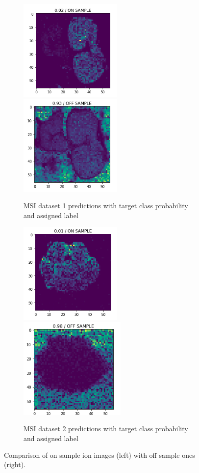 \documentclass[a4paper]{article}
\begin{document}
    \begin{figure}[H]
        \begin{subfigure}[b]{\textwidth}
            \centering
            \includegraphics[width=\textwidth,height=5cm,keepaspectratio]{on_sample_test_pred_1.png}
            \includegraphics[width=\textwidth,height=5cm,keepaspectratio]{off_sample_test_pred_1.png}
            \caption{MSI dataset 1 predictions with target class probability and assigned label}
        \end{subfigure}
        \begin{subfigure}[b]{\textwidth}
            \centering
            \includegraphics[width=\textwidth,height=5cm,keepaspectratio]{on_sample_test_pred_2.png}
            \includegraphics[width=\textwidth,height=5cm,keepaspectratio]{off_sample_test_pred_2.png}
            \caption{MSI dataset 2 predictions with target class probability and assigned label}
        \end{subfigure}
        \caption{Comparison of on sample ion images (left) with off sample ones (right).}
    \end{figure}
    
\end{document}
